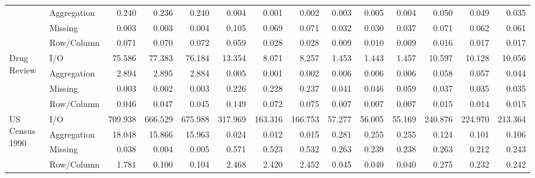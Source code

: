 \begin{tabular}{llrrrrrrrrrrrr}
 & Aggregation & 0.240 & 0.236 & 0.240 & 0.004 & 0.001 & 0.002 & 0.003 & 0.005 & 0.004 & 0.050 & 0.049 & 0.035 \\
 & Missing & 0.003 & 0.003 & 0.004 & 0.105 & 0.069 & 0.071 & 0.032 & 0.030 & 0.037 & 0.071 & 0.062 & 0.061 \\
 & Row/Column & 0.071 & 0.070 & 0.072 & 0.059 & 0.028 & 0.028 & 0.009 & 0.010 & 0.009 & 0.016 & 0.017 & 0.017 \\
\cline{1-14}
\multirow[t]{4}{*}{Drug Review} & I/O & 75.586 & 77.383 & 76.184 & 13.354 & 8.071 & 8.257 & 1.453 & 1.443 & 1.457 & 10.597 & 10.128 & 10.056 \\
 & Aggregation & 2.894 & 2.895 & 2.884 & 0.005 & 0.001 & 0.002 & 0.006 & 0.006 & 0.006 & 0.058 & 0.057 & 0.044 \\
 & Missing & 0.003 & 0.002 & 0.003 & 0.226 & 0.228 & 0.237 & 0.041 & 0.046 & 0.059 & 0.037 & 0.035 & 0.035 \\
 & Row/Column & 0.046 & 0.047 & 0.045 & 0.149 & 0.072 & 0.075 & 0.007 & 0.007 & 0.007 & 0.015 & 0.014 & 0.015 \\
\cline{1-14}
\multirow[t]{4}{*}{US Census 1990} & I/O & 709.938 & 666.529 & 675.988 & 317.969 & 163.316 & 166.753 & 57.277 & 56.005 & 55.169 & 240.876 & 224.970 & 213.364 \\
 & Aggregation & 18.048 & 15.866 & 15.963 & 0.024 & 0.012 & 0.015 & 0.281 & 0.255 & 0.255 & 0.124 & 0.101 & 0.106 \\
 & Missing & 0.038 & 0.004 & 0.005 & 0.571 & 0.523 & 0.532 & 0.263 & 0.239 & 0.238 & 0.263 & 0.212 & 0.243 \\
 & Row/Column & 1.781 & 0.100 & 0.104 & 2.468 & 2.420 & 2.452 & 0.045 & 0.040 & 0.040 & 0.275 & 0.232 & 0.242 \\
\cline{1-14}
\bottomrule
\end{tabular}
